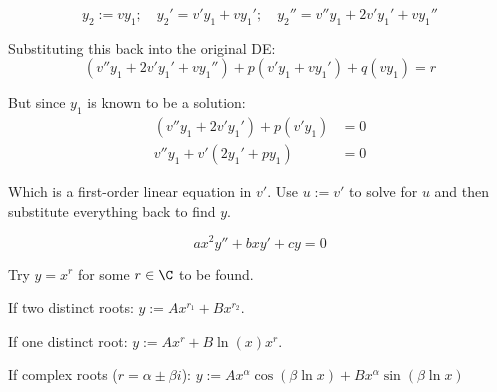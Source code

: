 \begin{compute}
	$$y_2:=vy_1;\quad y_2'=v'y_1+vy_1';\quad y_2''=v''y_1+2v'y_1'+vy_1''$$

	Substituting this back into the original DE:
	$$(v''y_1+2v'y_1'+vy_1'')+p(v'y_1+vy_1')+q(vy_1)=r$$

	But since $y_1$ is known to be a solution:
	\begin{align*}
		(v''y_1+2v'y_1')+p(v'y_1) & =0 \\
		v''y_1+v'(2y_1'+py_1)     & =0
	\end{align*}
	\QED
\end{compute}

Which is a first-order linear equation in $v'$. Use $u:=v'$ to solve
for $u$ and then substitute everything back to find $y$.


$$ax^2y''+bxy'+cy=0$$

Try $y=x^r$ for some $r\in\C$ to be found.

If two distinct roots: $y:=Ax^{r_1}+Bx^{r_2}$.

If one distinct root: $y:=Ax^r+B\ln(x)x^r$.

If complex roots ($r=\alpha\pm\beta i$): $y:=Ax^\alpha\cos(\beta\ln x)+Bx^\alpha\sin(\beta\ln x)$
